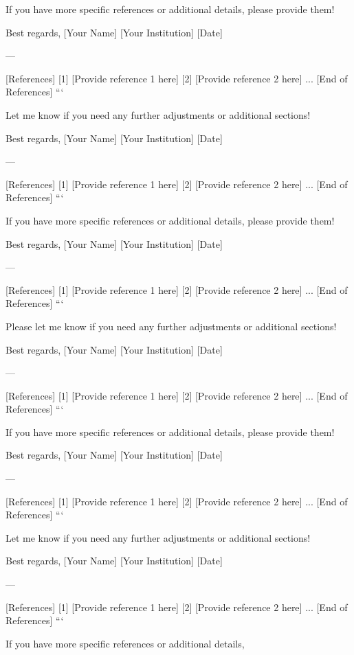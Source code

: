 If you have more specific references or additional details, please provide them! 

Best regards,  
[Your Name]  
[Your Institution]  
[Date]  

--- 

[References]  
[1] [Provide reference 1 here]  
[2] [Provide reference 2 here]  
...  
[End of References]  
``` 

Let me know if you need any further adjustments or additional sections! 

Best regards,  
[Your Name]  
[Your Institution]  
[Date]  

--- 

[References]  
[1] [Provide reference 1 here]  
[2] [Provide reference 2 here]  
...  
[End of References]  
``` 

If you have more specific references or additional details, please provide them! 

Best regards,  
[Your Name]  
[Your Institution]  
[Date]  

--- 

[References]  
[1] [Provide reference 1 here]  
[2] [Provide reference 2 here]  
...  
[End of References]  
``` 

Please let me know if you need any further adjustments or additional sections! 

Best regards,  
[Your Name]  
[Your Institution]  
[Date]  

--- 

[References]  
[1] [Provide reference 1 here]  
[2] [Provide reference 2 here]  
...  
[End of References]  
``` 

If you have more specific references or additional details, please provide them! 

Best regards,  
[Your Name]  
[Your Institution]  
[Date]  

--- 

[References]  
[1] [Provide reference 1 here]  
[2] [Provide reference 2 here]  
...  
[End of References]  
``` 

Let me know if you need any further adjustments or additional sections! 

Best regards,  
[Your Name]  
[Your Institution]  
[Date]  

--- 

[References]  
[1] [Provide reference 1 here]  
[2] [Provide reference 2 here]  
...  
[End of References]  
``` 

If you have more specific references or additional details,